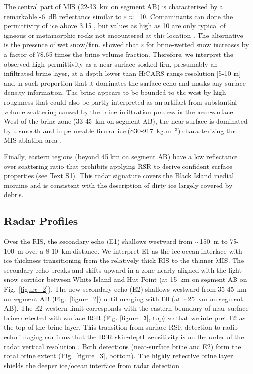 \documentclass[draft,grl]{agutex}
\begin{document}
\begin{article}
The central part of MIS (22-33~km on segment AB) is characterized by a remarkable -6~dB reflectance similar to $\varepsilon\approx$~10. Contaminants can dope the permittivity of ice above 3.15 \citep{Shabtaie-1995-ID639}, but values as high as 10 are only typical of igneous or metamorphic rocks not encountered at this location \citep{Telford-1990-ID688}. The alternative is the presence of wet snow/firn. \citet{Geldsetzer-2009-ID876} showed that $\varepsilon$ for brine-wetted snow increases by a factor of 78.65 times the brine volume fraction. Therefore, we interpret the observed high permittivity as a near-surface soaked firn, presumably an infiltrated brine layer, at a depth lower than HiCARS range resolution [5-10 m] and in such proportion that it dominates the surface echo and masks any surface density information. The brine appears to be bounded to the west by high roughness that could also be partly interpreted as an artifact from substantial volume scattering caused by the brine infiltration process in the near-surface. West of the brine zone (33-45~km on segment AB), the near-surface is dominated by a smooth and impermeable firn or ice (830-917~kg.m$^{-3}$) characterizing the MIS ablation area \citep{Mellor-1993-ID991}.

Finally, eastern regions (beyond 45 km on segment AB) have a low reflectance over scattering ratio that prohibits applying RSR to derive confident surface properties (see Text S1). This radar signature covers the Black Island medial moraine and is consistent with the  \citet{Glasser-2006-ID985} description of dirty ice largely covered by debris.


\subsection{Radar Profiles}
Over the RIS, the secondary echo (E1) shallows westward from $\sim$150~m to 75-100~m over a 8-10~km distance. We interpret E1 as the ice-ocean interface with ice thickness transitioning from the relatively thick RIS to the thinner MIS. The secondary echo breaks and shifts upward in a zone nearly aligned with the light snow corridor between White Island and Hut Point (at 15~km on segment AB on Fig.~\ref{figure_2}). The new secondary echo (E2) shallows westward from 35-45~km on segment AB (Fig.~\ref{figure_2}) until merging with E0 (at $\sim$25~km on segment AB). The E2 western limit corresponds with the eastern boundary of near-surface brine detected with surface RSR (Fig. \ref{figure_3}, top) so that we interpret E2 as the top of the brine layer. This transition from surface RSR detection to radio-echo imaging confirms that the RSR skin-depth sensitivity is on the order of the radar vertical resolution \citep{Grima-2014-ID867}. Both detections (near-surface brine and E2) form the total brine extent (Fig.~\ref{figure_3}, bottom). The highly reflective brine layer \citep{Geldsetzer-2009-ID876} shields the deeper ice/ocean interface from radar detection \citep[e.g.][]{Kovacs-1982-ID701}.


\end{article}
\end{document}

